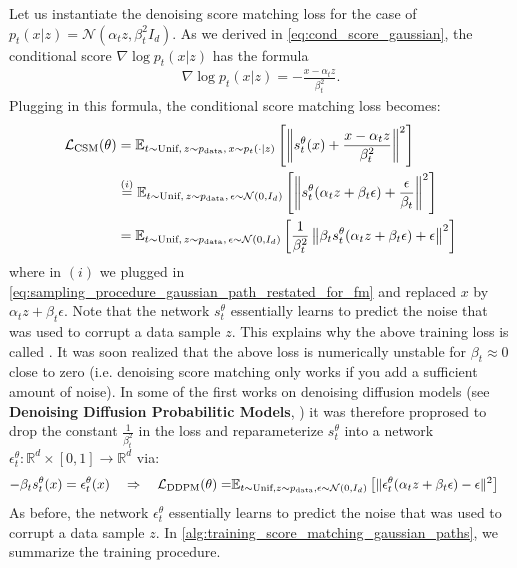 \begin{examplebox}
Let us instantiate the denoising score matching loss for the case of $p_t(x|z)=\mathcal{N}(\alpha_tz,\beta_t^2I_d)$. As we derived in \cref{eq:cond_score_gaussian}, the conditional score $\nabla\log p_t(x|z)$ has the formula
\begin{align}
\label{e:marginal_vf_cond_score_restated}
    \nabla\log p_t(x|z) = -\frac{x-\alpha_t z}{\beta_t^2}.
\end{align}
Plugging in this formula, the conditional score matching loss becomes:
\begin{align*}
        \mathcal{L}_{\text{CSM}}(\theta) &=\mathbb{E}_{t\sim\text{Unif},\,z\sim p_{\rm{data}},\,x\sim p_t(\cdot|z)}\left[\left\|s_t^\theta(x)+\frac{x-\alpha_t z}{\beta_t^2}\right\|^2\right]\\&\overset{(i)}{=}\mathbb{E}_{t\sim\text{Unif},\,z\sim p_{\rm{data}},\,\epsilon\sim \mathcal{N}(0,I_d)}\left[\left\|s_t^\theta(\alpha_tz+\beta_t\epsilon)+\frac{\epsilon}{\beta_t}\right\|^2\right]\\
        &=\mathbb{E}_{t\sim\text{Unif},\,z\sim p_{\rm{data}},\,\epsilon\sim \mathcal{N}(0,I_d)}\left[\frac{1}{\beta_t^2}\left\|\beta_ts_t^\theta(\alpha_tz+\beta_t\epsilon)+\epsilon\right\|^2\right]
\end{align*}
where in $(i)$ we plugged in \cref{eq:sampling_procedure_gaussian_path_restated_for_fm} and replaced $x$ by $\alpha_tz+\beta_t\epsilon$. Note that the network $s_t^\theta$ essentially learns to predict the noise that was used to corrupt a data sample $z$. This explains why the above training loss is  called . It was soon realized that the above loss is numerically unstable for $\beta_t\approx 0$ close to zero (i.e. denoising score matching only works if you add a sufficient amount of noise). In some of the first works on denoising diffusion models (see \textbf{Denoising Diffusion Probabilitic Models}, \citep{ho2020denoising}) it was therefore proprosed to drop the constant $\frac{1}{\beta_t^2}$ in the loss and reparameterize $s_t^\theta$ into a  network $\epsilon_t^\theta:\mathbb{R}^d\times[0,1]\to\mathbb{R}^d$ via:
\begin{align*}
    -\beta_t s_t^\theta(x) = \epsilon_t^\theta(x)\quad \Rightarrow \quad \mathcal{L}_{\text{DDPM}}(\theta) =&\mathbb{E}_{t\sim\text{Unif},z\sim p_{\rm{data}}, \epsilon\sim \mathcal{N}(0,I_d)}\left[\|\epsilon_t^\theta(\alpha_tz+\beta_t\epsilon)-\epsilon\|^2\right]
\end{align*}
As before, the network $\epsilon_t^\theta$ essentially learns to predict the noise that was used to corrupt a data sample $z$. In \cref{alg:training_score_matching_gaussian_paths}, we summarize the training procedure.
\end{examplebox}

